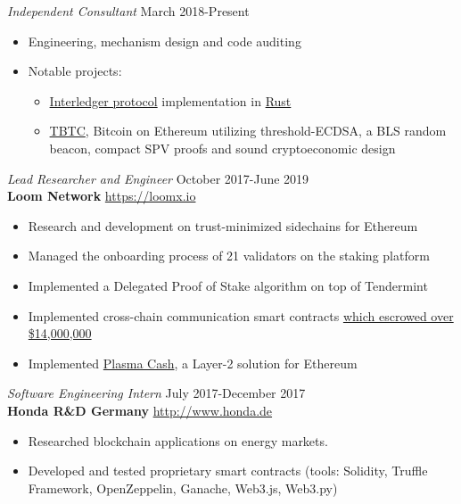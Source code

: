\documentclass[margin, line]{res} %
\begin{document}
{\sl Independent Consultant} \hfill March 2018-Present
\begin{itemize} \itemsep -2pt %
    \item Engineering, mechanism design and code auditing
    \item Notable projects: 
        \begin{itemize}
            \item \href{https://interledger.org/}{Interledger protocol}
    implementation in \href{https://github.com/emschwartz/interledger-rs}{Rust}
            \item \href{http://tbtc.network}{TBTC}, Bitcoin on Ethereum
            utilizing threshold-ECDSA, a BLS random beacon, compact SPV
            proofs and sound cryptoeconomic design
        \end{itemize}
\end{itemize}

{\sl Lead Researcher and Engineer} \hfill October 2017-June 2019 \\
\textbf{Loom Network} \hfill \url{https://loomx.io}
\begin{itemize} \itemsep -2pt %
    \item Research and development on trust-minimized sidechains for Ethereum
    \item Managed the onboarding process of 21 validators on the staking platform
    \item Implemented a Delegated Proof of Stake algorithm on top of Tendermint
    \item Implemented cross-chain communication smart contracts \href{https://web.archive.org/web/20190614104207/https://etherscan.io/address/0x8f8E8b3C4De76A31971Fe6a87297D8f703bE8570}{which escrowed
    over \$14,000,000}
    \item Implemented \href{http://github.com/loomnetwork/plasma-cash}{Plasma Cash}, a Layer-2 solution for Ethereum
\end{itemize}

{\sl Software Engineering Intern} \hfill July 2017-December 2017\\
\textbf{Honda R\&D Germany} \hfill \url{http://www.honda.de}
\begin{itemize} \itemsep -2pt %
    \item Researched blockchain applications on energy markets. 
    \item Developed and tested proprietary smart contracts (tools: Solidity, Truffle Framework, OpenZeppelin, Ganache, Web3.js, Web3.py)
\end{itemize}
\end{document}
